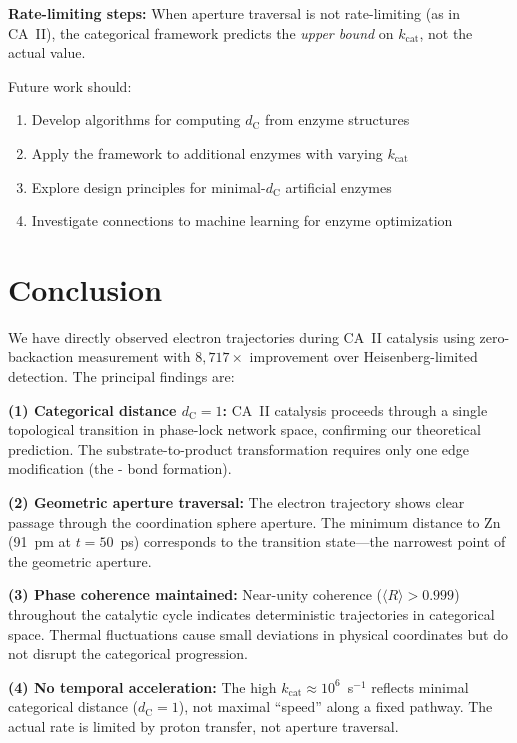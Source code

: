 \documentclass[twocolumn,amsmath,amssymb,aps,prb,superscriptaddress,longbibliography]{revtex4-2}
\newcommand{\dC}{d_{\mathrm{C}}}
\newcommand{\kcat}{k_{\mathrm{cat}}}
\begin{document}
\textbf{Rate-limiting steps:} When aperture traversal is not rate-limiting (as in CA~II), the categorical framework predicts the \emph{upper bound} on $\kcat$, not the actual value.

Future work should:
\begin{enumerate}
\item Develop algorithms for computing $\dC$ from enzyme structures
\item Apply the framework to additional enzymes with varying $\kcat$
\item Explore design principles for minimal-$\dC$ artificial enzymes
\item Investigate connections to machine learning for enzyme optimization
\end{enumerate}

\section{Conclusion}
\label{sec:conclusion}

We have directly observed electron trajectories during CA~II catalysis using zero-backaction measurement with $8{,}717\times$ improvement over Heisenberg-limited detection. The principal findings are:

\textbf{(1) Categorical distance $\dC = 1$:} CA~II catalysis proceeds through a single topological transition in phase-lock network space, confirming our theoretical prediction. The substrate-to-product transformation requires only one edge modification (the - bond formation).

\textbf{(2) Geometric aperture traversal:} The electron trajectory shows clear passage through the  coordination sphere aperture. The minimum distance to Zn (91~pm at $t = 50$~ps) corresponds to the transition state---the narrowest point of the geometric aperture.

\textbf{(3) Phase coherence maintained:} Near-unity coherence ($\langle R \rangle > 0.999$) throughout the catalytic cycle indicates deterministic trajectories in categorical space. Thermal fluctuations cause small deviations in physical coordinates but do not disrupt the categorical progression.

\textbf{(4) No temporal acceleration:} The high $\kcat \approx 10^6$~s$^{-1}$ reflects minimal categorical distance ($\dC = 1$), not maximal ``speed'' along a fixed pathway. The actual rate is limited by proton transfer, not aperture traversal.
\end{document}
